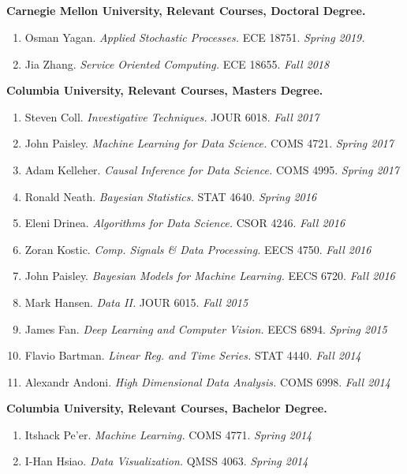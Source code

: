 \documentclass[margin]{res}
\begin{document}
\begin{resume}
\section{}
\textbf{Carnegie Mellon University, Relevant Courses, Doctoral Degree.}
\begin{enumerate}
	\item Osman Yagan. \textit{Applied Stochastic Processes.} ECE 18751. \hfill \textit{Spring 2019.}
	\item Jia Zhang.\textit{ Service Oriented Computing.} ECE 18655. \hfill \textit{Fall 2018}
\end{enumerate}
\textbf{Columbia University, Relevant Courses, Masters Degree.}
\begin{enumerate}
	\item Steven Coll. \textit{Investigative Techniques.} JOUR 6018. \hfill \textit{Fall 2017}
	\item John Paisley. \textit{Machine Learning for Data Science.} COMS 4721. \hfill \textit{Spring 2017}
	\item Adam Kelleher.\textit{ Causal Inference for Data Science.} COMS 4995. \hfill \textit{Spring 2017}
	\item Ronald Neath. \textit{Bayesian Statistics.} STAT 4640. \hfill \textit{Spring 2016}
	\item Eleni Drinea.\textit{ Algorithms for Data Science.} CSOR 4246. \hfill \textit{Fall 2016}
	\item Zoran Kostic. \textit{Comp. Signals \& Data Processing.} EECS 4750. \hfill \textit{Fall 2016}
	\item John Paisley.\textit{ Bayesian Models for Machine Learning.} EECS 6720. \hfill \textit{Fall 2016}
	\item Mark Hansen.\textit{ Data II.} JOUR 6015. \hfill \textit{Fall 2015} 
	\item James Fan. \textit{Deep Learning and Computer Vision.} EECS 6894. \hfill \textit{Spring 2015}
	\item Flavio Bartman. \textit{Linear Reg. and Time Series.} STAT 4440. \hfill \textit{Fall 2014}
	\item Alexandr Andoni. \textit{High Dimensional Data Analysis.} COMS 6998. \hfill \textit{Fall 2014}
\end{enumerate}
\textbf{Columbia University, Relevant Courses, Bachelor Degree.}
\begin{enumerate}
	\item Itshack Pe'er.\textit{ Machine Learning.} COMS 4771. \hfill \textit{Spring 2014}
	\item I-Han Hsiao. \textit{Data Visualization.} QMSS 4063. \hfill \textit{Spring 2014}

\end{enumerate}
\end{resume}
\end{document}
